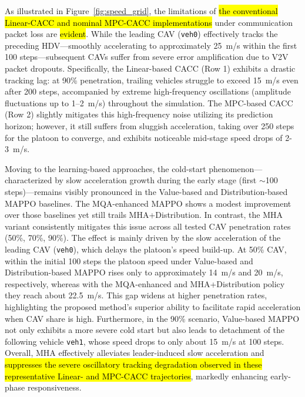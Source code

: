 \documentclass{ieeeaccess}
\begin{document}
As illustrated in Figure~\ref{fig:speed_grid}, the limitations of \hl{the conventional Linear-CACC and nominal MPC-CACC implementations} under communication packet loss are \hl{evident}. While the leading CAV (\texttt{veh0}) effectively tracks the preceding HDV—smoothly accelerating to approximately 25~m/s within the first 100 steps—subsequent CAVs suffer from severe error amplification due to V2V packet dropouts. Specifically, the Linear-based CACC (Row 1) exhibits a drastic tracking lag: at 90\% penetration, trailing vehicles struggle to exceed 15~m/s even after 200 steps, accompanied by extreme high-frequency oscillations (amplitude fluctuations up to 1--2~m/s) throughout the simulation. The MPC-based CACC (Row 2) slightly mitigates this high-frequency noise utilizing its prediction horizon; however, it still suffers from sluggish acceleration, taking over 250 steps for the platoon to converge, and exhibits noticeable mid-stage speed drops of 2-3~m/s.

Moving to the learning-based approaches, the cold-start phenomenon—characterized by slow acceleration growth during the early stage (first $\sim$100 steps)—remains visibly pronounced in the Value-based and Distribution-based MAPPO baselines. The MQA-enhanced MAPPO shows a modest improvement over those baselines yet still trails MHA+Distribution. In contrast, the MHA variant consistently mitigates this issue across all tested CAV penetration rates (50\%, 70\%, 90\%). The effect is mainly driven by the slow acceleration of the leading CAV (\texttt{veh0}), which delays the platoon’s speed build-up. At 50\% CAV, within the initial 100 steps the platoon speed under Value-based and Distribution-based MAPPO rises only to approximately 14~m/s and 20~m/s, respectively, whereas with the MQA-enhanced and MHA+Distribution policy they reach about 22.5~m/s. This gap widens at higher penetration rates, highlighting the proposed method’s superior ability to facilitate rapid acceleration when CAV share is high. Furthermore, in the 90\% scenario, Value-based MAPPO not only exhibits a more severe cold start but also leads to detachment of the following vehicle \texttt{veh1}, whose speed drops to only about 15~m/s at 100 steps. Overall, MHA effectively alleviates leader-induced slow acceleration and \hl{suppresses the severe oscillatory tracking degradation observed in these representative Linear- and MPC-CACC trajectories}, markedly enhancing early-phase responsiveness.
\end{document}
